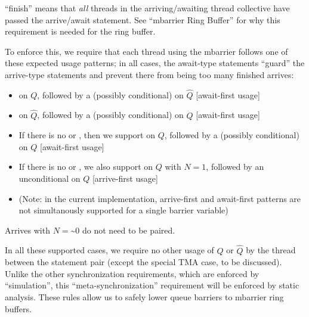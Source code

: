 \filbreak
``finish'' means that \textit{all} threads in the arriving/awaiting thread collective have passed the arrive/await statement.
See ``mbarrier Ring Buffer'' for why this requirement is needed for the ring buffer.

\filbreak
To enforce this, we require that each thread using the mbarrier follows one of these expected usage patterns; in all cases, the await-type statements ``guard'' the arrive-type statements and prevent there from being too many finished arrives:
\begin{itemize}
  \item {} on $Q$, followed by a (possibly conditional)  on $\widehat{Q}$ [await-first usage]
  \filbreak
  \item {} on $\widehat{Q}$, followed by a (possibly conditional)  on $Q$ [await-first usage]
  \filbreak
  \item If there is no  or , then we support  on $Q$, followed by a (possibly conditional)  on $Q$ [await-first usage]
  \filbreak
  \item If there is no  or , we also support  on $Q$ with $N=1$, followed by an unconditional  on $Q$ [arrive-first usage]
  \item (Note: in the current implementation, arrive-first and await-first patterns are not simultanously supported for a single barrier variable)
\end{itemize}

Arrives with $N = \text{\textasciitilde}0$ do not need to be paired.

\filbreak
In all these supported cases, we require no other usage of $Q$ or $\widehat{Q}$ by the thread between the statement pair (except the special TMA case, to be discussed).
Unlike the other synchronization requirements, which are enforced by ``simulation'', this ``meta-synchronization'' requirement will be enforced by static analysis.
These rules allow us to safely lower queue barriers to mbarrier ring buffers.

